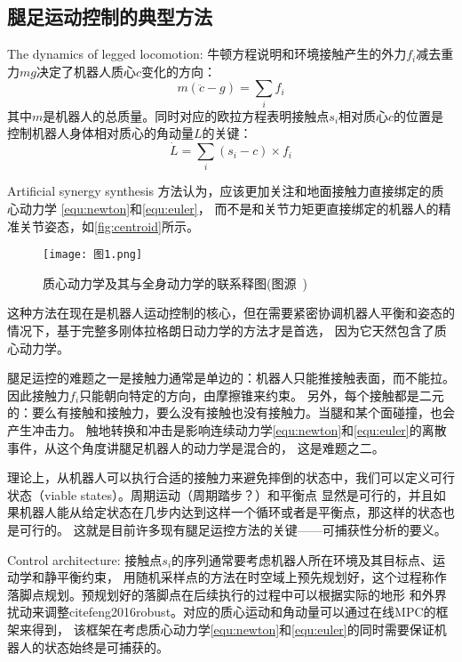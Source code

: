 \subsection{腿足运动控制的典型方法}

The dynamics of legged locomotion: 牛顿方程说明和环境接触产生的外力$f_i$减去重力$mg$决定了机器人质心$c$变化的方向：
\begin{equation}
    \label{equ:newton}
    m(\ddot{c}-g)=\sum_i f_i
\end{equation}
其中$m$是机器人的总质量。同时对应的欧拉方程表明接触点$s_i$相对质心$c$的位置是控制机器人身体相对质心的角动量$L$的关键：
\begin{equation}
    \label{equ:euler}
    \dot{L}=\sum_i\left(s_i-c\right) \times f_i
\end{equation}

Artificial synergy synthesis 方法认为，应该更加关注和地面接触力直接绑定的质心动力学
\autoref{equ:newton}和\autoref{equ:euler}，
而不是和关节力矩更直接绑定的机器人的精准关节姿态\cite{vukobratovic1972contribution}，如\autoref{fig:centroid}所示。
\begin{figure}[htbp]
    \centering
    \texttt{[image: 图1.png]}
    \caption{\label{fig:centroid}质心动力学及其与全身动力学的联系释图(图源~\cite{carpentier2016center})}
\end{figure}
这种方法在现在是机器人运动控制的核心，但在需要紧密协调机器人平衡和姿态的情况下，基于完整多刚体拉格朗日动力学的方法才是首选，
因为它天然包含了质心动力学\cite{orin2013centroidal}。

腿足运控的难题之一是接触力通常是单边的：机器人只能推接触表面，而不能拉。因此接触力$f_i$只能朝向特定的方向，由摩擦锥来约束。
另外，每个接触都是二元的：要么有接触和接触力，要么没有接触也没有接触力。当腿和某个面碰撞，也会产生冲击力。
触地转换和冲击是影响连续动力学\autoref{equ:newton}和\autoref{equ:euler}的离散事件，从这个角度讲腿足机器人的动力学是混合的，
这是难题之二。

理论上，从机器人可以执行合适的接触力来避免摔倒的状态中，我们可以定义可行状态（viable states）。周期运动（周期踏步？）和平衡点
显然是可行的，并且如果机器人能从给定状态在几步内达到这样一个循环或者是平衡点，那这样的状态也是可行的\cite{wieber2002stability}。
这就是目前许多现有腿足运控方法的关键\cite{wieber2016modeling}——可捕获性分析\cite{pratt2006velocity}的要义。

Control architecture: 接触点$s_i$的序列通常要考虑机器人所在环境及其目标点、运动学和静平衡约束\cite{escande2013planning}，
用随机采样点的方法在时空域上预先规划好，这个过程称作落脚点规划。预规划好的落脚点在后续执行的过程中可以根据实际的地形
和外界扰动来调整cite{feng2016robust}。对应的质心运动和角动量可以通过在线MPC的框架来得到\cite{wieber2006trajectory}，
该框架在考虑质心动力学\autoref{equ:newton}和\autoref{equ:euler}的同时需要保证机器人的状态始终是可捕获的\cite{wieber2016modeling}。

